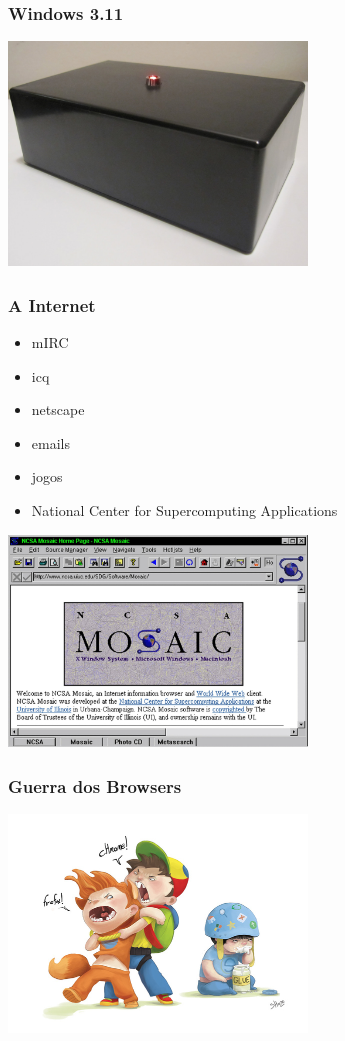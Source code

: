 \documentclass{beamer}
\begin{document}
\begin{frame} \frametitle{Windows 3.11}
\end{frame}

\begin{frame}
     \includegraphics[width=300px]{images/the-internet}
\end{frame}

\begin{frame} \frametitle{A Internet}
     \begin{itemize}
      \item mIRC
      \item icq
      \item netscape
      \item emails
      \item jogos
      \item National Center for Supercomputing Applications
     \end{itemize}
\end{frame}

\begin{frame}
     \includegraphics[width=300px]{images/mosaic}
\end{frame}

\begin{frame} \frametitle{Guerra dos Browsers}
    \includegraphics[width=300px]{images/browser-war}
\end{frame}
\end{document}
